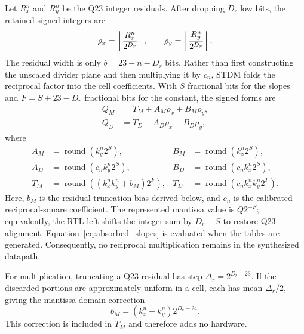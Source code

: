 \documentclass[conference]{IEEEtran}
\begin{document}
Let $R_x^n$ and $R_y^n$ be the Q23 integer residuals. After dropping $D_r$
low bits, the retained signed integers are
\begin{equation}
 \rho_x=\left\lfloor{R_x^n\over2^{D_r}}\right\rfloor,\qquad
 \rho_y=\left\lfloor{R_y^n\over2^{D_r}}\right\rfloor.
 \label{eq:retained_residuals}
\end{equation}
The residual width is only $b=23-n-D_r$ bits. Rather than first constructing
the unscaled divider plane and then multiplying it by $c_n$, STDM folds the
reciprocal factor into the cell coefficients. With $S$ fractional bits for the
slopes and $F=S+23-D_r$ fractional bits for the constant, the signed forms are
\begin{align}
 Q_M&=T_M+A_M\rho_x+B_M\rho_y,\label{eq:signed_mul_affine}\\
 Q_D&=T_D+A_D\rho_x-B_D\rho_y,\label{eq:signed_div_affine}
\end{align}
where
\begin{align}
 A_M&=\operatorname{round}(k_y^n2^S),&
 B_M&=\operatorname{round}(k_x^n2^S),\nonumber\\
 A_D&=\operatorname{round}(\bar c_nk_y^n2^S),&
 B_D&=\operatorname{round}(\bar c_nk_x^n2^S),
 \label{eq:absorbed_slopes}\\
 T_M&=\operatorname{round}((k_x^nk_y^n+b_M)2^F),&
 T_D&=\operatorname{round}(\bar c_nk_x^nk_y^n2^F).\nonumber
\end{align}
Here, $b_M$ is the residual-truncation bias derived below, and $\bar c_n$ is
the calibrated reciprocal-square coefficient. The represented mantissa value
is $Q2^{-F}$; equivalently, the RTL left shifts the integer sum by $D_r-S$ to
restore Q23 alignment. Equation~\eqref{eq:absorbed_slopes} is evaluated when
the tables are generated. Consequently, no reciprocal multiplication remains
in the synthesized datapath.

For multiplication, truncating a Q23 residual has step
$\Delta_r=2^{D_r-23}$. If the discarded portions are approximately uniform in
a cell, each has mean $\Delta_r/2$, giving the mantissa-domain correction
\begin{equation}
 b_M=(k_x^n+k_y^n)2^{D_r-24}.
 \label{eq:mul_truncation_bias}
\end{equation}
This correction is included in $T_M$ and therefore adds no hardware.
\end{document}
